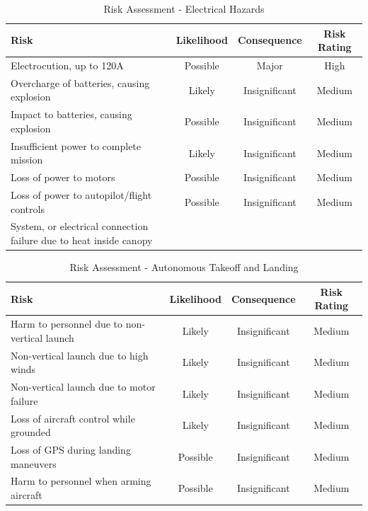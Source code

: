 \begin{table}[!ht]
	\label{tab:risks-electrical}
	\centering
	\begin{tabularx}{\textwidth}{|Y|c|c|c|}
		\hline
		\textbf{Risk} & \textbf{Likelihood} & \textbf{Consequence} & \textbf{Risk Rating}\\
		\hline
		Electrocution, up to 120A & Possible & Major & High\\
		\hline
		Overcharge of batteries, causing explosion & Likely & Insignificant & Medium\\
		\hline
		Impact to batteries, causing explosion & Possible & Insignificant & Medium\\
		\hline
		Insufficient power to complete mission & Likely & Insignificant & Medium\\
		\hline
		Loss of power to motors & Possible & Insignificant & Medium\\		
		\hline
		Loss of power to autopilot/flight controls & Possible & Insignificant & Medium\\
		\hline
		System, or electrical connection failure due to heat inside canopy &  &  & \\
		\hline
	\end{tabularx} 
	\caption{Risk Assessment - Electrical Hazards}
\end{table}

\begin{table}[!ht]
	\label{tab:risks-autonomy}
	\centering
	\begin{tabularx}{\textwidth}{|Y|c|c|c|}
		\hline
		\textbf{Risk} & \textbf{Likelihood} & \textbf{Consequence} & \textbf{Risk Rating}\\
		\hline
		Harm to personnel due to non-vertical launch & Likely & Insignificant & Medium\\
		\hline
		Non-vertical launch due to high winds & Likely & Insignificant & Medium\\
		\hline
		Non-vertical launch due to motor failure & Likely & Insignificant & Medium\\
		\hline
		Loss of aircraft control while grounded & Likely & Insignificant & Medium\\
		\hline
		Loss of GPS during landing maneuvers & Possible & Insignificant & Medium\\
		\hline
		Harm to personnel when arming aircraft & Possible & Insignificant & Medium\\
		\hline
	\end{tabularx} 
	\caption{Risk Assessment - Autonomous Takeoff and Landing}
\end{table}

